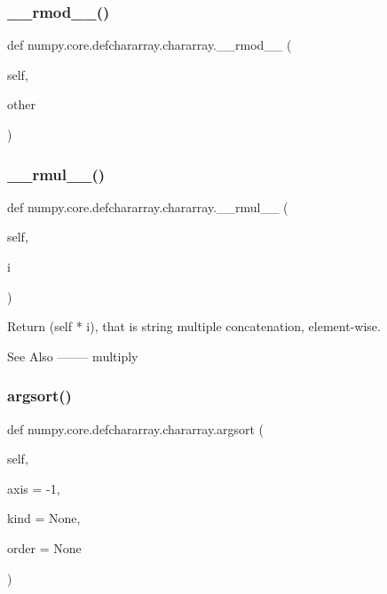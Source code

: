 \subsubsection{\texorpdfstring{\+\_\+\+\_\+rmod\+\_\+\+\_\+()}{\_\_rmod\_\_()}}
{\footnotesize\ttfamily def numpy.\+core.\+defchararray.\+chararray.\+\_\+\+\_\+rmod\+\_\+\+\_\+ (\begin{DoxyParamCaption}\item[{}]{self,  }\item[{}]{other }\end{DoxyParamCaption})}

\mbox{\label{classnumpy_1_1core_1_1defchararray_1_1chararray_a86e998982b6f1a16065f0bcda9470205}} 
\subsubsection{\texorpdfstring{\+\_\+\+\_\+rmul\+\_\+\+\_\+()}{\_\_rmul\_\_()}}
{\footnotesize\ttfamily def numpy.\+core.\+defchararray.\+chararray.\+\_\+\+\_\+rmul\+\_\+\+\_\+ (\begin{DoxyParamCaption}\item[{}]{self,  }\item[{}]{i }\end{DoxyParamCaption})}

\begin{DoxyVerb}Return (self * i), that is string multiple concatenation,
element-wise.

See Also
--------
multiply
\end{DoxyVerb}
 \mbox{\label{classnumpy_1_1core_1_1defchararray_1_1chararray_adf9197f6436a9ff080705869265883d3}} 
\subsubsection{\texorpdfstring{argsort()}{argsort()}}
{\footnotesize\ttfamily def numpy.\+core.\+defchararray.\+chararray.\+argsort (\begin{DoxyParamCaption}\item[{}]{self,  }\item[{}]{axis = {\ttfamily -\/1},  }\item[{}]{kind = {\ttfamily None},  }\item[{}]{order = {\ttfamily None} }\end{DoxyParamCaption})}

